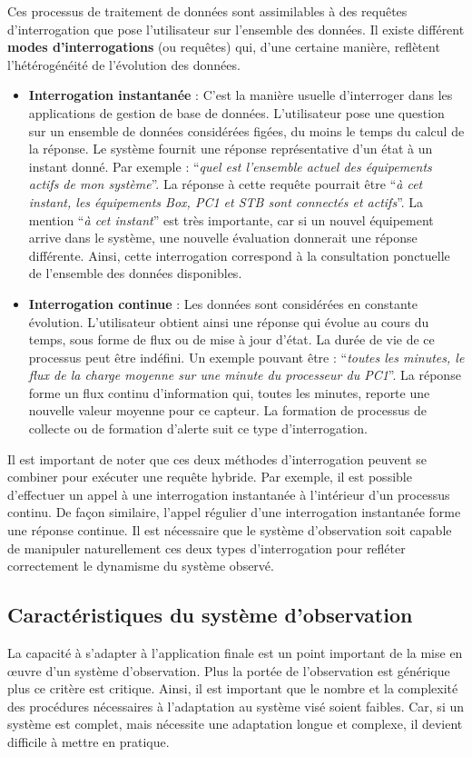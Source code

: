 Ces processus de traitement de données sont assimilables à des requêtes d'interrogation que pose l'utilisateur sur l'ensemble des données. Il existe différent \textbf{modes d'interrogations} (ou requêtes) qui, d'une certaine manière, reflètent l'hétérogénéité de l'évolution des données.
\begin{itemize}
    \item \textbf{Interrogation instantanée} : C'est la manière usuelle d'interroger dans les applications de gestion de base de données. L'utilisateur pose une question sur un ensemble de données considérées figées, du moins le temps du calcul de la réponse. Le système fournit une réponse représentative d'un état à un instant donné. Par exemple : \enquote{\it quel est l'ensemble actuel des équipements actifs de mon système}. La réponse à cette requête pourrait être \enquote{\it à cet instant, les équipements Box, PC1 et STB sont connectés et actifs}. La mention \enquote{\it à cet instant} est très importante, car si un nouvel équipement arrive dans le système, une nouvelle évaluation donnerait une réponse différente. Ainsi, cette interrogation correspond à la consultation ponctuelle de l'ensemble des données disponibles.
    \item \textbf{Interrogation continue} : Les données sont considérées en constante évolution. L'utilisateur obtient ainsi une réponse qui évolue au cours du temps, sous forme de flux ou de mise à jour d'état. La durée de vie de ce processus peut être indéfini. Un exemple pouvant être : \enquote{\it toutes les minutes, le flux de la charge moyenne sur une minute du processeur du PC1}. La réponse forme un flux continu d'information qui, toutes les minutes, reporte une nouvelle valeur moyenne pour ce capteur. La formation de processus de collecte ou de formation d'alerte suit ce type d'interrogation.
\end{itemize}

Il est important de noter que ces deux méthodes d'interrogation peuvent se combiner pour exécuter une requête hybride. Par exemple, il est possible d'effectuer un appel à une interrogation instantanée à l'intérieur d'un processus continu. De façon similaire, l'appel régulier d'une interrogation instantanée forme une réponse continue. Il est nécessaire que le système d'observation soit capable de manipuler naturellement ces deux types d'interrogation pour refléter correctement le dynamisme du système observé.

\subsection{Caractéristiques du système d'observation}\label{sec:intro:problematique:monitoring}
La capacité à s'adapter à l'application finale est un point important de la mise en œuvre d'un système d'observation. Plus la portée de l'observation est générique plus ce critère est critique. Ainsi, il est important que le nombre et la complexité des procédures nécessaires à l'adaptation au système visé soient faibles. Car, si un système est complet, mais nécessite une adaptation longue et complexe, il devient difficile à mettre en pratique.

